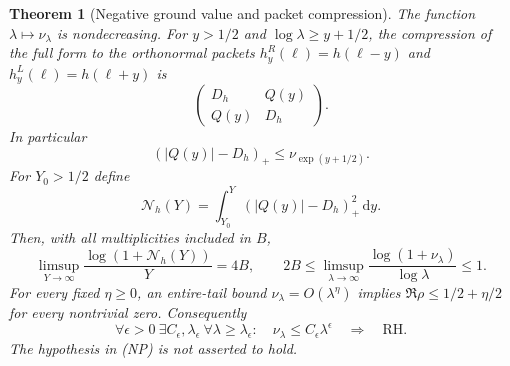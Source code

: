\documentclass[11pt]{article}
\newtheorem{theorem}{Theorem}
\theoremstyle{remark}\newtheorem{remark}[theorem]{Remark}
\newcommand{\dd}{\,\mathrm d}
\begin{document}
\begin{theorem}[Negative ground value and packet compression]
\label{thm:negative-ground}
The function $\lambda\mapsto\nu_\lambda$ is nondecreasing.
For $y>1/2$ and $\log\lambda\ge y+1/2$, the compression of
the full form to the orthonormal packets
$h_y^R(\ell)=h(\ell-y)$ and $h_y^L(\ell)=h(\ell+y)$ is
\[
 \begin{pmatrix}D_h&Q(y)\\Q(y)&D_h\end{pmatrix}.
\]
In particular
\[
 (|Q(y)|-D_h)_+\le\nu_{\exp(y+1/2)}.
 \tag{NG}
\]
For $Y_0>1/2$ define
\[
 \mathcal N_h(Y)=\int_{Y_0}^{Y}(|Q(y)|-D_h)_+^2\dd y .
\]
Then, with all multiplicities included in $B$,
\[
 \limsup_{Y\to\infty}\frac{\log(1+\mathcal N_h(Y))}{Y}=4B,
 \qquad
 2B\le
 \limsup_{\lambda\to\infty}
       \frac{\log(1+\nu_\lambda)}{\log\lambda}\le1.
 \tag{NR}
\]
For every fixed $\eta\ge0$, an entire-tail bound
$\nu_\lambda=O(\lambda^\eta)$ implies
$\Re\rho\le1/2+\eta/2$ for every nontrivial zero.
Consequently
\[
 \forall\epsilon>0\ \exists C_\epsilon,\lambda_\epsilon\
 \forall\lambda\ge\lambda_\epsilon:\quad
 \nu_\lambda\le C_\epsilon\lambda^\epsilon
 \quad\Longrightarrow\quad\mathrm{RH}.
 \tag{NP}
\]
The hypothesis in (NP) is not asserted to hold.
\end{theorem}
\end{document}
